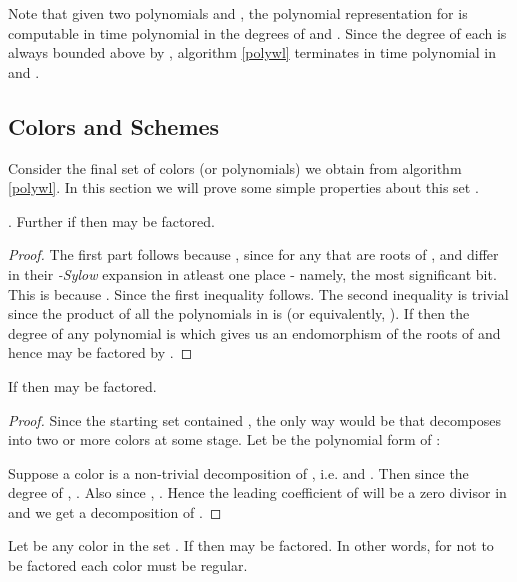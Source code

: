 			
         Note that given two polynomials  and , the polynomial representation for  is computable in time polynomial in the degrees of  and . Since the degree of each  is always bounded above
	 by , algorithm \ref{polywl} terminates in time polynomial in  and . 
	 
	 
	 \subsection{Colors and Schemes}\label{sec:scheme}
	 Consider the final set of colors (or polynomials)  we obtain from algorithm \ref{polywl}. In this section we will prove some simple properties about this set .

	 \begin{lemma}\label{thin}
		 . Further if  then  may be factored.
	 \end{lemma}

	 \begin{proof}
		The first part follows because , since for any  that are roots of ,  and  differ in their \emph{-Sylow} expansion in atleast one place
		- namely, the most significant bit. This is because . Since  the first inequality follows. The second inequality 
		is trivial since the product of all the polynomials in  is  (or equivalently, ). If  then the degree of any polynomial
		 is  which gives us an endomorphism of the roots of  and hence  may be factored by \cite{evdokimov}.
	\end{proof}


	\begin{lemma} \label{identity}
		If  then  may be factored.
	\end{lemma}

	\begin{proof}
			Since the starting set contained , the only way  would be that  decomposes into two or more colors at some stage. Let  be the polynomial form of :
			
			
			Suppose a color  is a non-trivial decomposition of , i.e.  and . Then since  the degree of , . Also since ,
			. Hence the leading coefficient of  will be a zero divisor in  and we get a decomposition of .

		\end{proof}
			

		\begin{lemma}\label{regular}
		 Let  be any color in the set . If  then  may be factored. In other words, for
		  not to be factored each color  must be regular.
	 \end{lemma}


